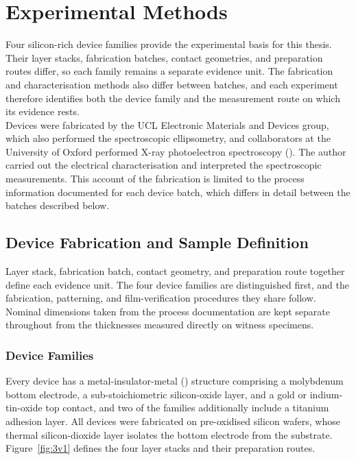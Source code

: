 \chapter{Experimental Methods}\label{ch:fab}

\noindent Four silicon-rich  device families provide the experimental basis for this thesis. Their
layer stacks, fabrication batches, contact geometries, and preparation routes differ, so each family remains a
separate evidence unit. The fabrication and characterisation methods also differ between batches, and each
experiment therefore identifies both the device family and the measurement route on which its evidence rests.\\

\noindent Devices were fabricated by the UCL Electronic Materials and Devices group, which also performed the
spectroscopic ellipsometry, and collaborators at the University of Oxford performed X-ray photoelectron
spectroscopy (). The author carried
out the electrical characterisation and interpreted the spectroscopic measurements. This account of the fabrication is limited to the
process information documented for each device batch, which differs in detail between the batches described below.

\section[Device Fabrication and Sample Definition]{Device Fabrication and Sample Definition}

\noindent Layer stack, fabrication batch, contact geometry, and preparation route together define each evidence
unit. The four device families are distinguished first, and the fabrication, patterning, and film-verification
procedures they share follow. Nominal dimensions taken from the process documentation are kept separate throughout
from the thicknesses measured directly on witness specimens.

\subsection[Device Families]{Device Families}
\label{sec:matstack}

\noindent Every device has a metal-insulator-metal () structure comprising a molybdenum bottom
electrode, a sub-stoichiometric silicon-oxide layer, and a gold or indium-tin-oxide top contact, and two of the
families additionally include a titanium adhesion layer. All devices were fabricated on pre-oxidised silicon wafers,
whose thermal silicon-dioxide layer isolates the bottom electrode from the substrate. Figure~\ref{fig:3v1} defines the four layer stacks and their preparation routes.\\

